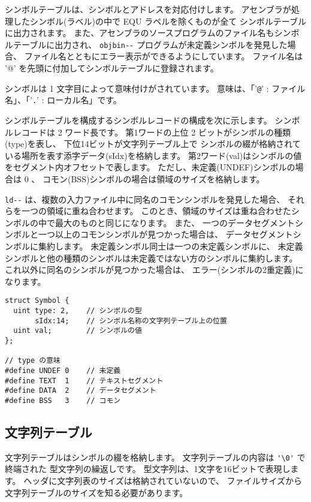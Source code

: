 シンボルテーブルは、シンボルとアドレスを対応付けします。
アセンブラが処理したシンボル(ラベル)の中で EQU ラベルを除くものが全て
シンボルテーブルに出力されます。
また、アセンブラのソースプログラムのファイル名もシンボルテーブルに出力され、
\verb/objbin--/ プログラムが未定義シンボルを発見した場合、
ファイル名とともにエラー表示ができるようにしています。
ファイル名は '@' を先頭に付加してシンボルテーブルに登録されます。

シンボルは 1 文字目によって意味付けがされています。
意味は、「'\verb/@/' : ファイル名」、「'\verb/./' : ローカル名」です。

シンボルテーブルを構成するシンボルレコードの構成を次に示します。
シンボルレコードは 2 ワード長です。
第1ワードの上位 2 ビットがシンボルの種類(type)を表し、
下位14ビットが文字列テーブル上で
シンボルの綴が格納されている場所を表す添字データ(sIdx)を格納します。
第2ワード(val)はシンボルの値をセグメント内オフセットで表します。
ただし、未定義(UNDEF)シンボルの場合は 0 、
コモン(BSS)シンボルの場合は領域のサイズを格納します。

\verb/ld--/ は、複数の入力ファイル中に同名のコモンシンボルを発見した場合、
それらを一つの領域に重ね合わせます。
このとき、領域のサイズは重ね合わせたシンボルの中で最大のものと同じになります。
また、
一つのデータセグメントシンボルと一つ以上のコモンシンボルが見つかった場合は、
データセグメントシンボルに集約します。
未定義シンボル同士は一つの未定義シンボルに、
未定義シンボルと他の種類のシンボルは未定義ではない方のシンボルに集約します。
これ以外に同名のシンボルが見つかった場合は、
エラー(シンボルの2重定義)になります。

\begin{mylist}
\begin{verbatim}
struct Symbol {
  uint type: 2,    // シンボルの型
       sIdx:14;    // シンボル名称の文字列テーブル上の位置
  uint val;        // シンボルの値
};

// type の意味
#define UNDEF 0    // 未定義
#define TEXT  1    // テキストセグメント
#define DATA  2    // データセグメント
#define BSS   3    // コモン
\end{verbatim}
\end{mylist}

\subsection{文字列テーブル}

文字列テーブルはシンボルの綴を格納します。
文字列テーブルの内容は \verb/'\0'/ で終端された \cmml 型文字列の繰返しです。
\cmml 型文字列は、1文字を16ビットで表現します。
ヘッダに文字列表のサイズは格納されていないので、
ファイルサイズから文字列テーブルのサイズを知る必要があります。


